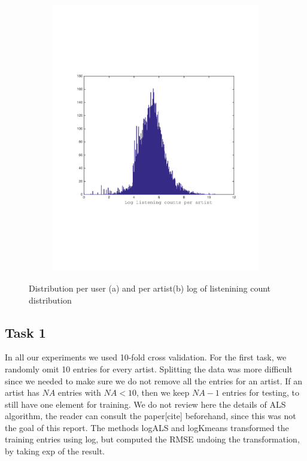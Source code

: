 \begin{figure}[h]
\begin{subfigure}[b]{0.45\textwidth}
    \includegraphics[width=\textwidth]{figures/histCountPerArtist.pdf}
    \caption{}
  \end{subfigure}
  \caption{Distribution per user (a) and per artist(b) log of listenining count distribution}
  \label{fig:user_artist_distribution}
\end{figure}

 
\subsection{Task 1}
In all our experiments we used 10-fold cross validation.
For the first task, we randomly omit 10 entries for every artist.
Splitting the data was more difficult since we needed to make sure we do not
remove all the entries for an artist. If an artist has $NA$ entries with $NA < 10$, then we keep $NA-1$ entries for testing,
 to still have one element for training.
We do not review here the details of ALS algorithm, the reader can consult the paper[cite] beforehand, since this was not the goal of this report.
The methods logALS and logKmeans transformed the training entries using log, but computed the RMSE undoing the transformation, by taking exp of the result.
 
